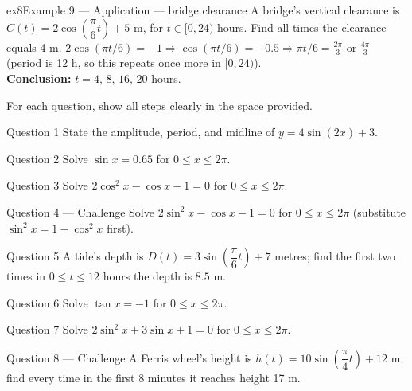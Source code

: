 \documentclass[11pt]{article}
\begin{document}
\begin{example}{ex8}{Example 9 --- Application --- bridge clearance}
A bridge's vertical clearance is $C(t)=2\cos\!\left(\dfrac{\pi}6t\right)+5$ m, for $t\in[0,24)$ hours. Find all times the clearance equals 4 m.\soln
$2\cos(\pi t/6)=-1\Rightarrow\cos(\pi t/6)=-0.5\Rightarrow\pi t/6=\tfrac{2\pi}3$ or $\tfrac{4\pi}3$ (period is 12 h, so this repeats once more in $[0,24)$).\\[3pt]\textbf{Conclusion:} $t=4,\,8,\,16,\,20$ hours.
\end{example}

\clearpage
{}
For each question, show all steps clearly in the space provided.

\begin{qbox}{Question 1}
State the amplitude, period, and midline of $y=4\sin(2x)+3$.\workspace{2.4cm}
\end{qbox}

\begin{qbox}{Question 2}
Solve $\sin x=0.65$ for $0\leq x\leq2\pi$.\workspace{2.4cm}
\end{qbox}

\begin{qbox}{Question 3}
Solve $2\cos^2x-\cos x-1=0$ for $0\leq x\leq2\pi$.\workspace{2.4cm}
\end{qbox}

\begin{qbox}{Question 4 --- Challenge}
Solve $2\sin^2x-\cos x-1=0$ for $0\leq x\leq2\pi$ (substitute $\sin^2x=1-\cos^2x$ first).\workspace{3.4cm}
\end{qbox}

\begin{qbox}{Question 5}
A tide's depth is $D(t)=3\sin\!\left(\dfrac{\pi}{6}t\right)+7$ metres; find the first two times in $0\leq t\leq12$ hours the depth is $8.5$ m.\workspace{2.4cm}
\end{qbox}

\begin{qbox}{Question 6}
Solve $\tan x=-1$ for $0\leq x\leq2\pi$.\workspace{2.4cm}
\end{qbox}

\begin{qbox}{Question 7}
Solve $2\sin^2x+3\sin x+1=0$ for $0\leq x\leq2\pi$.\workspace{2.4cm}
\end{qbox}

\begin{qbox}{Question 8 --- Challenge}
A Ferris wheel's height is $h(t)=10\sin\!\left(\dfrac{\pi}{4}t\right)+12$ m; find every time in the first 8 minutes it reaches height 17 m.\workspace{3.4cm}
\end{qbox}
\end{document}
